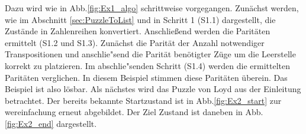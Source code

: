 Dazu wird wie in Abb.\ref{fig:Ex1_algo} schrittweise vorgegangen. Zunächst werden, wie im Abschnitt \ref{sec:PuzzleToList} und in Schritt 1 (S1.1) dargestellt, die Zustände in Zahlenreihen konvertiert.
Anschließend werden die Paritäten ermittelt (S1.2 und S1.3). Zunächst die Parität der Anzahl notwendiger Transpositionen und anschlie"send die Parität benötigter Züge um die Leerstelle korrekt zu platzieren. Im abschlie"senden Schritt (S1.4) werden die ermittelten Paritäten verglichen. In diesem Beispiel stimmen diese Paritäten überein. Das Beispiel ist also lösbar.%
\WNL%
%
%
Als nächstes wird das Puzzle von Loyd aus der Einleitung betrachtet. Der bereits bekannte Startzustand ist in Abb.\ref{fig:Ex2_start} zur wereinfachung erneut abgebildet. Der Ziel Zustand ist daneben in Abb.\ref{fig:Ex2_end} dargestellt.\\
